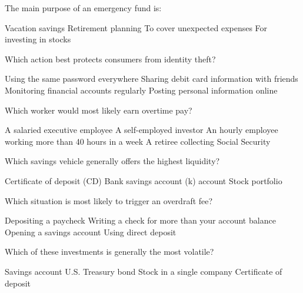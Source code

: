\documentclass[12pt]{exam}
\begin{document}
\begin{questions}
	\begin{mcquestion}[2]
		The main purpose of an emergency fund is:
		\begin{choices}
			\choice Vacation savings
			\choice Retirement planning
			\CorrectChoice To cover unexpected expenses
			\choice For investing in stocks
		\end{choices}
	\end{mcquestion}
	
	\begin{mcquestion}[2]
		Which action best protects consumers from identity theft?
		\begin{choices}
			\choice Using the same password everywhere
			\choice Sharing debit card information with friends
			\CorrectChoice Monitoring financial accounts regularly
			\choice Posting personal information online
		\end{choices}
	\end{mcquestion}
	
	\begin{mcquestion}[2]
		Which worker would most likely earn overtime pay?
		\begin{choices}
			\choice A salaried executive employee
			\choice A self-employed investor
			\CorrectChoice An hourly employee working more than 40 hours in a week
			\choice A retiree collecting Social Security
		\end{choices}
	\end{mcquestion}
	
	\begin{mcquestion}[2]
		Which savings vehicle generally offers the highest liquidity?
		\begin{choices}
			\choice Certificate of deposit (CD)
			\CorrectChoice Bank savings account
			(k) account
			\choice Stock portfolio
		\end{choices}
	\end{mcquestion}
	
	\begin{mcquestion}[2]
		Which situation is most likely to trigger an overdraft fee?
		\begin{choices}
			\choice Depositing a paycheck
			\CorrectChoice Writing a check for more than your account balance
			\choice Opening a savings account
			\choice Using direct deposit
		\end{choices}
	\end{mcquestion}
	
	\begin{mcquestion}[2]
		Which of these investments is generally the most volatile?
		\begin{choices}
			\choice Savings account
			\choice U.S. Treasury bond
			\CorrectChoice Stock in a single company
			\choice Certificate of deposit
		\end{choices}
	\end{mcquestion}
	

\end{questions}
\end{document}
